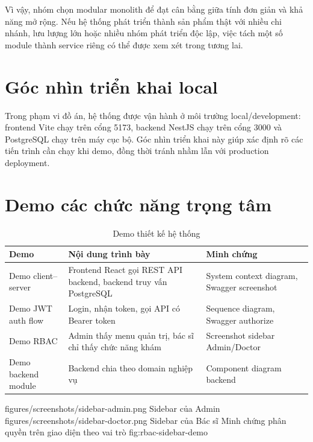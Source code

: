 Vì vậy, nhóm chọn modular monolith để đạt cân bằng giữa tính đơn giản và khả năng mở rộng. Nếu hệ thống phát triển thành sản phẩm thật với nhiều chi nhánh, lưu lượng lớn hoặc nhiều nhóm phát triển độc lập, việc tách một số module thành service riêng có thể được xem xét trong tương lai.

\section{Góc nhìn triển khai local}

Trong phạm vi đồ án, hệ thống được vận hành ở môi trường local/development: frontend Vite chạy trên cổng 5173, backend NestJS chạy trên cổng 3000 và PostgreSQL chạy trên máy cục bộ. Góc nhìn triển khai này giúp xác định rõ các tiến trình cần chạy khi demo, đồng thời tránh nhầm lẫn với production deployment.


\section{Demo các chức năng trọng tâm}

\begin{longtable}{|p{3.4cm}|p{5.5cm}|p{5.2cm}|}
\caption{Demo thiết kế hệ thống}\\
\hline
\textbf{Demo} & \textbf{Nội dung trình bày} & \textbf{Minh chứng } \\
\hline
Demo client--server & Frontend React gọi REST API backend, backend truy vấn PostgreSQL & System context diagram, Swagger screenshot \\
\hline
Demo JWT auth flow & Login, nhận token, gọi API có Bearer token & Sequence diagram, Swagger authorize \\
\hline
Demo RBAC & Admin thấy menu quản trị, bác sĩ chỉ thấy chức năng khám & Screenshot sidebar Admin/Doctor \\
\hline
Demo backend module & Backend chia theo domain nghiệp vụ & Component diagram backend \\
\hline
\end{longtable}

\TwoDemoFigures
{figures/screenshots/sidebar-admin.png}
{Sidebar của Admin}
{figures/screenshots/sidebar-doctor.png}
{Sidebar của Bác sĩ}
{Minh chứng phân quyền trên giao diện theo vai trò}
{fig:rbac-sidebar-demo}
